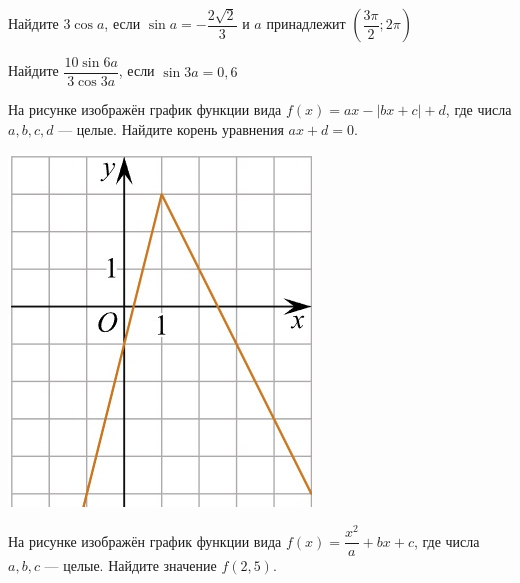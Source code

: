 \begin{homework}[number=1]
\begin{listofex}
		\item Найдите \( 3\cos{a} \), если \( \sin{a}= - \dfrac{2\sqrt{2}}{3} \) и \(a\) принадлежит \( \left( \dfrac{3\pi}{2}; 2\pi \right) \)
		\item Найдите \( \dfrac{10\sin{6a}}{3\cos{3a}} \), если \( \sin{3a}=0,6 \)
		\item
		\begin{minipage}[t]{0.3\textwidth}
			На рисунке изображён график функции вида \(f(x)=ax-|bx+c|+d\), где числа \(a, b, c, d\) --- целые. Найдите корень уравнения \(ax+d=0\).
		\end{minipage}
		\begin{minipage}[c]{0.1\textwidth}
			\includegraphics[align=t, width=\textwidth]{../../pics/G111M4C5-3.jpg}
		\end{minipage}
		\item 
		\begin{minipage}[t]{0.3\textwidth}
			На рисунке изображён график функции вида \(f(x)=\dfrac{x^2}{a}+bx+c\), где числа \(a, b, c\) --- целые. Найдите значение \(f(2,5)\).
		\end{minipage}
		\begin{minipage}[c]{0.12\textwidth}

\end{minipage}
\end{listofex}
\end{homework}
